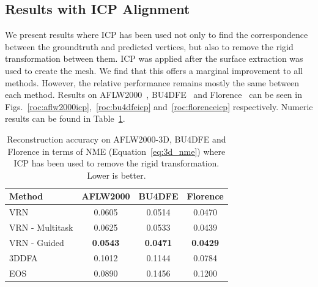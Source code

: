 \subsection{Results with ICP Alignment}
\label{sec:faceicpres}

We present results where ICP has been used not only to find the
correspondence between the groundtruth and predicted vertices, but
also to remove the rigid transformation between them. ICP was applied
after the surface extraction was used to create the mesh. We find that
this offers a marginal improvement to all methods. However, the
relative performance remains mostly the same between each
method. Results on AFLW2000~\cite{zhu2016face},
BU4DFE~\cite{yin2008high} and Florence~\cite{masi2d3dFaceData} can be
seen in Figs.~\ref{roc:aflw2000icp},~\ref{roc:bu4dfeicp}
and~\ref{roc:florenceicp} respectively. Numeric results can be found
in Table~\ref{tab:overviewicp}.

\begin{table}
  \caption[Numerical performance of 3D face reconstruction with
  ICP]{Reconstruction accuracy on AFLW2000-3D, BU4DFE and Florence in
    terms of NME (Equation~\ref{eq:3d_nme}) where ICP has been used to
    remove the rigid transformation. Lower is better. }
  \label{tab:overviewicp}
  \centering\vspace{1mm}
  \small
\begin{tabular}{|l||c|c|c|}
  \hline
  \textbf{Method}   & \textbf{AFLW2000} & \textbf{BU4DFE} & \textbf{Florence} \\
  \hline\hline
  VRN               & 0.0605 & 0.0514 & 0.0470   \\
  VRN - Multitask   &   0.0625    & 0.0533     & 0.0439        \\
  VRN - Guided      & \textbf{0.0543} & \textbf{0.0471} & \textbf{0.0429}   \\

\hline
  3DDFA~\cite{zhu2016face}             & 0.1012 & 0.1144 & 0.0784   \\
  EOS~\cite{huber2016multiresolution}  & 0.0890 & 0.1456 & 0.1200   \\
  \hline
\end{tabular}
\end{table}

